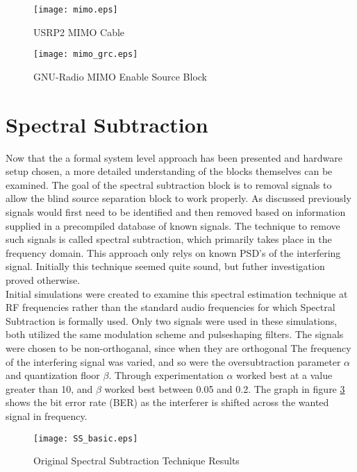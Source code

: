 \begin{figure}[!ht]\label{mimo}
\centering
\texttt{[image: mimo.eps]}%
\caption{USRP2 MIMO Cable}
\end{figure} 

\begin{figure}[!ht]\label{mimo_grc}
\centering
\texttt{[image: mimo\_grc.eps]}
\caption{GNU-Radio MIMO Enable Source Block}
\end{figure} 


\section{Spectral Subtraction}

Now that the a formal system level approach has been presented and hardware setup chosen, a more detailed understanding of the blocks themselves can be examined.  The goal of the spectral subtraction block is to removal signals to allow the blind source separation block to work properly.  As discussed previously signals would first need to be identified and then removed based on information supplied in a precompiled database of known signals.  The technique to remove such signals is called spectral subtraction, which primarily takes place in the frequency domain.  This approach only relys on known PSD's of the interfering signal.  Initially this technique seemed quite sound, but futher investigation proved otherwise.\\

Initial simulations were created to examine this spectral estimation technique at RF frequencies rather than the standard audio frequencies for which Spectral Subtraction is formally used.  Only two signals were used in these simulations, both utilized the same modulation scheme and pulseshaping filters.  The signals were chosen to be non-orthoganal, since when they are orthogonal The frequency of the interfering signal was varied, and so were the oversubtraction parameter \(\alpha\) and quantization floor \(\beta\).  Through experimentation \(\alpha\) worked best at a value greater than 10, and \(\beta\) worked best between 0.05 and 0.2.  The graph in figure \ref{SS_basic} shows the bit error rate (BER) as the interferer is shifted across the wanted signal in frequency.\\

\begin{figure}\label{SS_basic}
\centering
\texttt{[image: SS\_basic.eps]}
\caption{Original Spectral Subtraction Technique Results}
\end{figure} 

